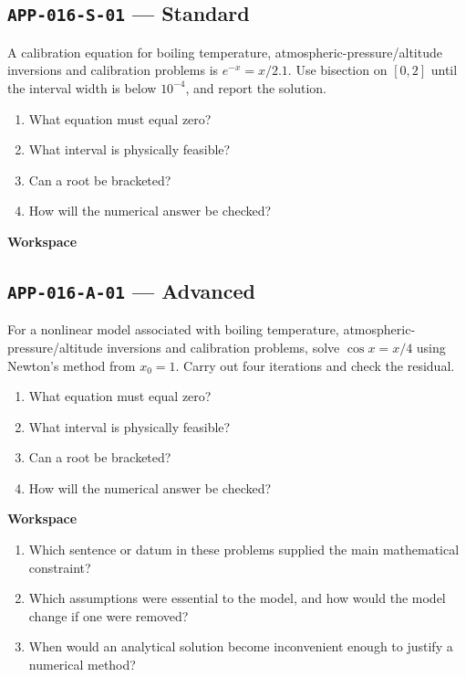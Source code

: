 \documentclass[11pt]{book}
\newcommand{\pid}[1]{\texttt{#1}}
\newcommand{\workspace}{\par\vspace{0.7in}\hrulefill\par\vspace{0.55in}\hrulefill\par}
\begin{document}
\subsection*{\pid{APP-016-S-01} — Standard}
\begin{problembox}
A calibration equation for boiling temperature, atmospheric-pressure/altitude inversions and calibration problems is $e^{-x}=x/2.1$. Use bisection on $[0,2]$ until the interval width is below $10^{-4}$, and report the solution.
\end{problembox}
\begin{promptbox}\begin{enumerate}
\item What equation must equal zero?
\item What interval is physically feasible?
\item Can a root be bracketed?
\item How will the numerical answer be checked?
\end{enumerate}\end{promptbox}
\textbf{Workspace}\workspace
{}
\subsection*{\pid{APP-016-A-01} — Advanced}
\begin{problembox}
For a nonlinear model associated with boiling temperature, atmospheric-pressure/altitude inversions and calibration problems, solve $\cos x=x/4$ using Newton's method from $x_0=1$. Carry out four iterations and check the residual.
\end{problembox}
\begin{promptbox}\begin{enumerate}
\item What equation must equal zero?
\item What interval is physically feasible?
\item Can a root be bracketed?
\item How will the numerical answer be checked?
\end{enumerate}\end{promptbox}
\textbf{Workspace}\workspace
\begin{reflectionbox}\begin{enumerate}
\item Which sentence or datum in these problems supplied the main mathematical constraint?
\item Which assumptions were essential to the model, and how would the model change if one were removed?
\item When would an analytical solution become inconvenient enough to justify a numerical method?
\end{enumerate}\end{reflectionbox}
\end{document}
